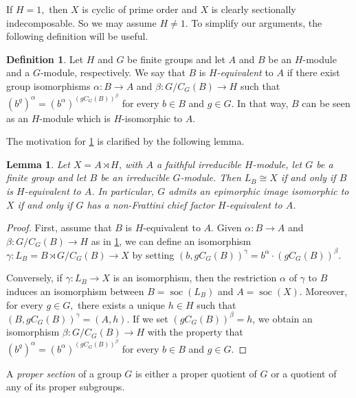 \documentclass[a4paper,10pt]{amsart}
\theoremstyle{plain}
\newtheorem{lemma}[thm]{Lemma}
\theoremstyle{definition}
\newtheorem{definition}[thm]{Definition}
\DeclareMathOperator{\soc}{soc}
\begin{document}
If $H=1,$ then $X$ is cyclic of prime order and $X$ is clearly sectionally indecomposable. So we may assume $H\neq 1.$ 
To simplify our arguments, the following definition will be useful.


\begin{definition}\label{defequiv} Let $H$ and $G$ be finite groups and let $A$ and $B$ be an $H$-module and a $G$-module, respectively. We say that $B$ is \emph{$H$-equivalent} to $A$ if there exist group isomorphisms $\alpha: B\to A$ and $\beta: G/C_G(B)\to H$ such that $(b^g)^\alpha=(b^\alpha)^{(gC_G(B))^\beta}$ for every $b\in B$
and $g\in G.$  In that way, $B$ can be seen as an $H$-module which is $H$-isomorphic to $A$.
\end{definition}


The motivation for \cref{defequiv} is clarified by the following lemma.


\begin{lemma}\label{eqandcf}Let $X=A \rtimes H$, with $A$ a faithful irreducible $H$-module, let $G$ be a finite group and let $B$ be an irreducible $G$-module.  Then $L_B\cong X$ if and only if $B$ is $H$-equivalent to $A$. In particular, $G$ admits an epimorphic image isomorphic to $X$ if and only if $G$ has a non-Frattini chief factor $H$-equivalent to $A$.
\end{lemma}
\begin{proof}
    First, assume that $B$ is $H$-equivalent to $A$. Given $\alpha\colon B\to A$ and
    $\beta\colon G/C_G(B)\to H$ as in \cref{defequiv}, we can define an isomorphism
    $\gamma\colon L_B=B\rtimes G/C_G(B)\to X$ by setting $(b,gC_G(B))^\gamma=b^\alpha\cdot(gC_G(B))^\beta.$

    Conversely, if $\gamma\colon L_B\to X$ is an isomorphism, then the restriction $\alpha$ of $\gamma$ to $B$ induces an isomorphism between $B=\soc(L_B)$ and $A=\soc(X)$. Moreover, for every $g\in G,$ there exists a unique $h\in H$ such that $(B,gC_G(B))^\gamma=(A,h)$. If we set $(gC_G(B))^\beta=h$, we obtain an isomorphism $\beta\colon G/C_G(B)\to H$ with the property  that $(b^g)^\alpha=(b^\alpha)^{(gC_G(B))^\beta}$ for every $b\in B$
    and $g\in G.$
\end{proof}

A \emph{proper section} of a group $G$ is either a proper quotient of $G$ or a quotient of any of its proper subgroups.
\end{document}
